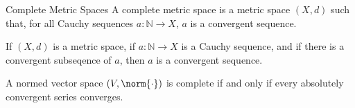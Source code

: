 \documentclass[crop=false,class=book,oneside]{standalone}
\begin{document}
            \begin{ldefinition}{Complete Metric Spaces}
                A complete metric space is a metric space
                $(X,d)$ such that, for all Cauchy sequences
                $a:\mathbb{N}\rightarrow{X}$, $a$ is a convergent
                sequence.
            \end{ldefinition}
            \begin{theorem}
                If $(X,d)$ is a metric space, if
                $a:\mathbb{N}\rightarrow{X}$ is a Cauchy
                sequence, and if there is a convergent subseqence
                of $a$, then $a$ is a convergent sequence.
            \end{theorem}
            \begin{theorem}
                A normed vector space $(V,\norm{\cdot})$ is
                complete if and only if every absolutely
                convergent series converges.
            \end{theorem}
\end{document}
